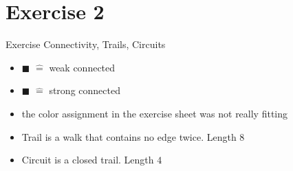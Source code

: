
\section{Exercise 2}

\setcounter{exercise}{1}

\begin{frame}[allowframebreaks]{Exercise \thesection}{Connectivity, Trails, Circuits}
    \begin{exercisenoinc}
    \end{exercisenoinc}
    \begin{solution}
        \begin{itemize}
            \item \textcolor{SecondaryColor}{$\blacksquare$} $\hat=$ weak connected
            \item \textcolor{PrimaryColor}{$\blacksquare$} $\hat=$ strong connected
            \item the color assignment in the exercise sheet was not really fitting
        \end{itemize}
    \end{solution}
    \begin{exercisenoinc}
    \end{exercisenoinc}
    \begin{solutionnoinc}
        \begin{itemize}
            \item \alert{Trail} is a walk that contains no edge twice. Length $8$
        \end{itemize}
    \end{solutionnoinc}
    \begin{exercisenoinc}
    \end{exercisenoinc}
    \begin{solutionnoinc}
        \begin{itemize}
            \item \alert{Circuit} is a closed trail. Length $4$
        \end{itemize}
    \end{solutionnoinc}
\end{frame}
